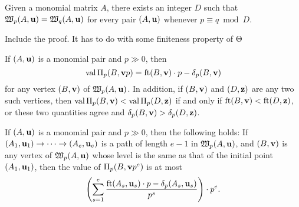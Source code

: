 \documentclass[11pt]{amsart}
\begin{document}
\begin{proposition}
Given a monomial matrix $A$, there exists an integer $D$ such that $\mathfrak{W}_p(A, \mathbf{u}) = \mathfrak{W}_q(A, \mathbf{u})$ for every pair $(A, \mathbf{u})$ whenever $p \equiv q \bmod D$.
\end{proposition}

\alert[inline]{Include the proof.  It has to do with some finiteness property of $\Theta$}

\begin{corollary}
If $(A, \mathbf{u})$ is a monomial pair and $p \gg 0$, then
\[ \operatorname{val} \Pi_p(B, \mathbf{v}p) = \operatorname{ft}(B, \mathbf{v}) \cdot p - \delta_p(B, \mathbf{v}) \] for any vertex $(B, \mathbf{v})$ of $\mathfrak{W}_p(A, \mathbf{u})$.    In addition, if $(B, \mathbf{v})$ and $(D, \mathbf{z})$ are any two such vertices, then $\operatorname{val} \Pi_p(B, \mathbf{v}) < \operatorname{val} \Pi_p(D, \mathbf{z})$ if and only if $\operatorname{ft}(B, \mathbf{v}) < \operatorname{ft}(D, \mathbf{z})$, or these two quantities agree and $\delta_p(B, \mathbf{v}) > \delta_p(D, \mathbf{z})$.  
\end{corollary}


\begin{theorem}
If $(A, \mathbf{u})$ is a monomial pair and $p \gg 0$, then the following holds\textup:  If 
$(A_1, \mathbf{u}_1) \to \cdots \to (A_e, \mathbf{u}_e)$ is a path of length $e-1$ in $\mathfrak{W}_p(A, \mathbf{u})$, and $(B, \mathbf{v})$ is any vertex of $\mathfrak{W}_p(A, \mathbf{u})$ whose level is the same as that of the initial point $(A_1, \mathbf{u}_1)$, then the value of $\Pi_p(B, \mathbf{v}p^e)$ is at most 
%
 \[ \left( \sum_{s=1}^e \frac{ \operatorname{ft}(A_s, \mathbf{u}_s)  \cdot p - \delta_p(A_s, \mathbf{u}_s)}{p^s} \right) \cdot p^e. \] 
\end{theorem}
\end{document}
